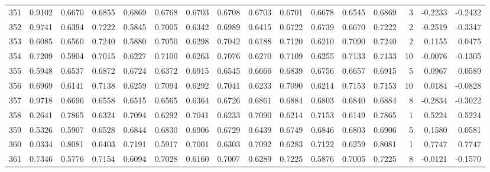 \begin{tabular}{lrrrrrrrrrrrrrrr}
351 &      0.9102 &  0.6670 &  0.6855 &  0.6869 &  0.6768 &  0.6703 &  0.6708 &  0.6703 &  0.6701 &  0.6678 &   0.6545 &     0.6869 &      3 &                   -0.2233 &                    -0.2432 \\
352 &      0.9741 &  0.6394 &  0.7222 &  0.5845 &  0.7005 &  0.6342 &  0.6989 &  0.6415 &  0.6722 &  0.6739 &   0.6670 &     0.7222 &      2 &                   -0.2519 &                    -0.3347 \\
353 &      0.6085 &  0.6560 &  0.7240 &  0.5880 &  0.7050 &  0.6298 &  0.7042 &  0.6188 &  0.7120 &  0.6210 &   0.7090 &     0.7240 &      2 &                    0.1155 &                     0.0475 \\
354 &      0.7209 &  0.5904 &  0.7015 &  0.6227 &  0.7100 &  0.6263 &  0.7076 &  0.6270 &  0.7109 &  0.6255 &   0.7133 &     0.7133 &     10 &                   -0.0076 &                    -0.1305 \\
355 &      0.5948 &  0.6537 &  0.6872 &  0.6724 &  0.6372 &  0.6915 &  0.6545 &  0.6666 &  0.6839 &  0.6756 &   0.6657 &     0.6915 &      5 &                    0.0967 &                     0.0589 \\
356 &      0.6969 &  0.6141 &  0.7138 &  0.6259 &  0.7094 &  0.6292 &  0.7041 &  0.6233 &  0.7090 &  0.6214 &   0.7153 &     0.7153 &     10 &                    0.0184 &                    -0.0828 \\
357 &      0.9718 &  0.6696 &  0.6558 &  0.6515 &  0.6565 &  0.6364 &  0.6726 &  0.6861 &  0.6884 &  0.6803 &   0.6840 &     0.6884 &      8 &                   -0.2834 &                    -0.3022 \\
358 &      0.2641 &  0.7865 &  0.6324 &  0.7094 &  0.6292 &  0.7041 &  0.6233 &  0.7090 &  0.6214 &  0.7153 &   0.6149 &     0.7865 &      1 &                    0.5224 &                     0.5224 \\
359 &      0.5326 &  0.5907 &  0.6528 &  0.6844 &  0.6830 &  0.6906 &  0.6729 &  0.6439 &  0.6749 &  0.6846 &   0.6803 &     0.6906 &      5 &                    0.1580 &                     0.0581 \\
360 &      0.0334 &  0.8081 &  0.6403 &  0.7191 &  0.5917 &  0.7001 &  0.6303 &  0.7092 &  0.6283 &  0.7122 &   0.6259 &     0.8081 &      1 &                    0.7747 &                     0.7747 \\
361 &      0.7346 &  0.5776 &  0.7154 &  0.6094 &  0.7028 &  0.6160 &  0.7007 &  0.6289 &  0.7225 &  0.5876 &   0.7005 &     0.7225 &      8 &                   -0.0121 &                    -0.1570 \\

\end{tabular}
